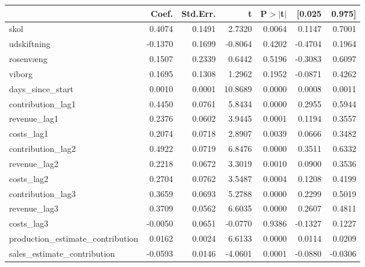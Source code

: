\begin{table}
\begin{center}
\begin{tabular}{lrrrrrr}
\hline
                                   &   Coef. & Std.Err. &       t & P$> |$t$|$ &  [0.025 &  0.975]  \\
\hline
skol                               &  0.4074 &   0.1491 &  2.7320 &      0.0064 &  0.1147 &  0.7001  \\
udskiftning                        & -0.1370 &   0.1699 & -0.8064 &      0.4202 & -0.4704 &  0.1964  \\
rosenvæng                          &  0.1507 &   0.2339 &  0.6442 &      0.5196 & -0.3083 &  0.6097  \\
viborg                             &  0.1695 &   0.1308 &  1.2962 &      0.1952 & -0.0871 &  0.4262  \\
days\_since\_start                 &  0.0010 &   0.0001 & 10.8689 &      0.0000 &  0.0008 &  0.0011  \\
contribution\_lag1                 &  0.4450 &   0.0761 &  5.8434 &      0.0000 &  0.2955 &  0.5944  \\
revenue\_lag1                      &  0.2376 &   0.0602 &  3.9445 &      0.0001 &  0.1194 &  0.3557  \\
costs\_lag1                        &  0.2074 &   0.0718 &  2.8907 &      0.0039 &  0.0666 &  0.3482  \\
contribution\_lag2                 &  0.4922 &   0.0719 &  6.8476 &      0.0000 &  0.3511 &  0.6332  \\
revenue\_lag2                      &  0.2218 &   0.0672 &  3.3019 &      0.0010 &  0.0900 &  0.3536  \\
costs\_lag2                        &  0.2704 &   0.0762 &  3.5487 &      0.0004 &  0.1208 &  0.4199  \\
contribution\_lag3                 &  0.3659 &   0.0693 &  5.2788 &      0.0000 &  0.2299 &  0.5019  \\
revenue\_lag3                      &  0.3709 &   0.0562 &  6.6035 &      0.0000 &  0.2607 &  0.4811  \\
costs\_lag3                        & -0.0050 &   0.0651 & -0.0770 &      0.9386 & -0.1327 &  0.1227  \\
production\_estimate\_contribution &  0.0162 &   0.0024 &  6.6133 &      0.0000 &  0.0114 &  0.0209  \\
sales\_estimate\_contribution      & -0.0593 &   0.0146 & -4.0601 &      0.0001 & -0.0880 & -0.0306  \\
\hline
\end{tabular}
\end{center}


\end{table}
